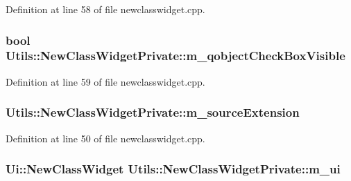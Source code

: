 Definition at line 58 of file newclasswidget.\-cpp.

\hypertarget{struct_utils_1_1_new_class_widget_private_ab1352df8bf86533b49c7554d73460407}{
\subsubsection[{m\-\_\-qobject\-Check\-Box\-Visible}]{\setlength{\rightskip}{0pt plus 5cm}bool Utils\-::\-New\-Class\-Widget\-Private\-::m\-\_\-qobject\-Check\-Box\-Visible}}\label{struct_utils_1_1_new_class_widget_private_ab1352df8bf86533b49c7554d73460407}


Definition at line 59 of file newclasswidget.\-cpp.

\hypertarget{struct_utils_1_1_new_class_widget_private_a57663ba2bf51531e42dae77e2b9e9ee3}{
\subsubsection[{m\-\_\-source\-Extension}]{ Utils\-::\-New\-Class\-Widget\-Private\-::m\-\_\-source\-Extension}}\label{struct_utils_1_1_new_class_widget_private_a57663ba2bf51531e42dae77e2b9e9ee3}


Definition at line 50 of file newclasswidget.\-cpp.

\hypertarget{struct_utils_1_1_new_class_widget_private_ac77c98af40bd07fd9d14e4f0e04a7bd5}{
\subsubsection[{m\-\_\-ui}]{\setlength{\rightskip}{0pt plus 5cm}Ui\-::\-New\-Class\-Widget Utils\-::\-New\-Class\-Widget\-Private\-::m\-\_\-ui}}\label{struct_utils_1_1_new_class_widget_private_ac77c98af40bd07fd9d14e4f0e04a7bd5}


